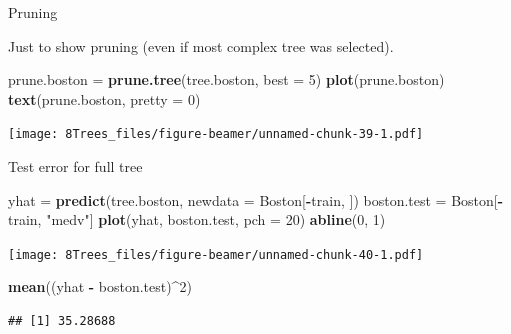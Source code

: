 \documentclass[10pt,ignorenonframetext,]{beamer}
\newenvironment{Shaded}{\begin{snugshade}}{\end{snugshade}}
\newcommand{\KeywordTok}[1]{\textcolor[rgb]{0.13,0.29,0.53}{\textbf{#1}}}
\newcommand{\DataTypeTok}[1]{\textcolor[rgb]{0.13,0.29,0.53}{#1}}
\newcommand{\DecValTok}[1]{\textcolor[rgb]{0.00,0.00,0.81}{#1}}
\newcommand{\StringTok}[1]{\textcolor[rgb]{0.31,0.60,0.02}{#1}}
\newcommand{\OperatorTok}[1]{\textcolor[rgb]{0.81,0.36,0.00}{\textbf{#1}}}
\newcommand{\NormalTok}[1]{#1}
\begin{document}
\begin{frame}[fragile]

\begin{block}{Pruning}

Just to show pruning (even if most complex tree was selected).

\begin{Shaded}
\begin{Highlighting}[]
\NormalTok{prune.boston =}\StringTok{ }\KeywordTok{prune.tree}\NormalTok{(tree.boston, }\DataTypeTok{best =} \DecValTok{5}\NormalTok{)}
\KeywordTok{plot}\NormalTok{(prune.boston)}
\KeywordTok{text}\NormalTok{(prune.boston, }\DataTypeTok{pretty =} \DecValTok{0}\NormalTok{)}
\end{Highlighting}
\end{Shaded}

\texttt{[image: 8Trees\_files/figure-beamer/unnamed-chunk-39-1.pdf]}

\end{block}

\end{frame}

\begin{frame}[fragile]

\begin{block}{Test error for full tree}

\begin{Shaded}
\begin{Highlighting}[]
\NormalTok{yhat =}\StringTok{ }\KeywordTok{predict}\NormalTok{(tree.boston, }\DataTypeTok{newdata =}\NormalTok{ Boston[}\OperatorTok{-}\NormalTok{train, ])}
\NormalTok{boston.test =}\StringTok{ }\NormalTok{Boston[}\OperatorTok{-}\NormalTok{train, }\StringTok{"medv"}\NormalTok{]}
\KeywordTok{plot}\NormalTok{(yhat, boston.test, }\DataTypeTok{pch =} \DecValTok{20}\NormalTok{)}
\KeywordTok{abline}\NormalTok{(}\DecValTok{0}\NormalTok{, }\DecValTok{1}\NormalTok{)}
\end{Highlighting}
\end{Shaded}

\texttt{[image: 8Trees\_files/figure-beamer/unnamed-chunk-40-1.pdf]}

\begin{Shaded}
\begin{Highlighting}[]
\KeywordTok{mean}\NormalTok{((yhat }\OperatorTok{-}\StringTok{ }\NormalTok{boston.test)}\OperatorTok{^}\DecValTok{2}\NormalTok{)}
\end{Highlighting}
\end{Shaded}

\begin{verbatim}
## [1] 35.28688
\end{verbatim}

\end{block}

\end{frame}
\end{document}
